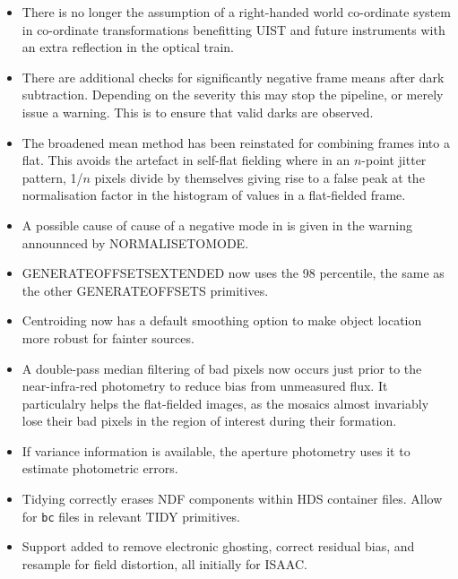 \documentclass[twoside,11pt]{article}
\newcommand{\htmladdnormallink}[2]{#1}
\renewcommand{\_}{\texttt{\symbol{95}}}
\newcommand{\ISAAC}{\htmladdnormallink{ISAAC}{http://www.eso.org/instruments/isaac/}}
\begin{document}
\begin{itemize}
   \item There is no longer the assumption of a right-handed world
   co-ordinate system in co-ordinate transformations benefitting UIST
   and future instruments with an extra reflection in the optical train.

   \item There are additional checks for significantly negative frame
   means after dark subtraction.  Depending on the severity this may
   stop the pipeline, or merely issue a warning.  This is to ensure
   that valid darks are observed.

   \item The broadened mean method has been reinstated for combining
   frames into a flat.  This avoids the artefact in self-flat fielding
   where in an $n$-point jitter pattern, 1/$n$ pixels divide by
   themselves giving rise to a false peak at the normalisation factor
   in the histogram of values in a flat-fielded frame.

   \item A possible cause of cause of a negative mode in is given in
   the warning announnced by \_NORMALISE\_TO\_MODE\_.
   
   \item \_GENERATE\_OFFSETS\_EXTENDED\_ now uses the 98 percentile,
   the same as the other \_GENERATE\_OFFSETS\_ primitives.
   
   \item Centroiding now has a default smoothing option to make
   object location more robust for fainter sources.

   \item A double-pass median filtering of bad pixels now occurs just prior
   to the near-infra-red photometry to reduce bias from unmeasured flux.
   It particulalry helps the flat-fielded images, as the mosaics 
   almost invariably lose their bad pixels in the region of interest
   during their formation.
  
   \item If variance information is available, the aperture photometry
   uses it to estimate photometric errors.

   \item Tidying correctly erases NDF components within HDS container
   files.  Allow for {\tt \_bc} files in relevant \_TIDY\_ primitives.

   \item Support added to remove electronic ghosting, correct residual
   bias, and resample for field distortion, all initially for \ISAAC.
\end{itemize}
\end{document}
